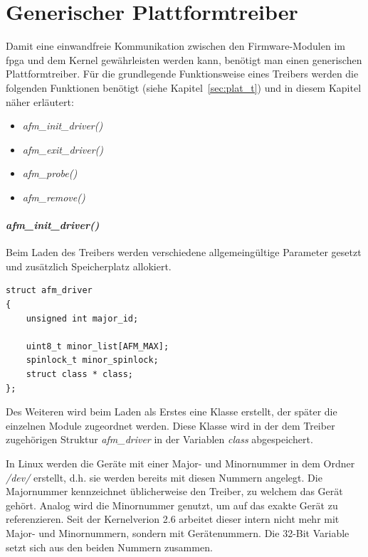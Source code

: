 \section{Generischer Plattformtreiber} \label{sec:plat}
Damit eine einwandfreie Kommunikation zwischen den Firmware-Modulen im \ac{fpga} und dem Kernel gewährleisten werden kann, benötigt man einen generischen Plattformtreiber.
Für die grundlegende  Funktionsweise eines Treibers werden die folgenden Funktionen benötigt (siehe Kapitel~\ref{sec:plat_t}) und in diesem Kapitel näher erläutert:

\begin{itemize}
	\item \textit{afm\_init\_driver()}
	\item \textit{afm\_exit\_driver()}
	\item \textit{afm\_probe()}
	\item \textit{afm\_remove()}
\end{itemize}


\paragraph*{\textit{afm\_init\_driver()}}
Beim Laden des Treibers werden verschiedene allgemeingültige Parameter gesetzt und zusätzlich Speicherplatz allokiert. 


\begin{lstfloat}
\begin{lstlisting}
struct afm_driver
{
	unsigned int major_id;

	uint8_t minor_list[AFM_MAX];
	spinlock_t minor_spinlock;
	struct class * class;
};
\end{lstlisting}
\end{lstfloat}

Des Weiteren wird beim Laden als Erstes eine Klasse erstellt, der später die einzelnen Module zugeordnet werden. Diese Klasse wird in der dem Treiber zugehörigen Struktur \textit{afm\_driver} in der Variablen \textit{class} abgespeichert. 

In Linux werden die Geräte mit einer Major- und Minornummer in dem Ordner \textit{/dev/} erstellt, d.h. sie werden bereits mit diesen Nummern angelegt.
Die Majornummer kennzeichnet üblicherweise den Treiber, zu welchem das Gerät gehört. Analog wird die Minornummer genutzt, um auf das exakte Gerät zu referenzieren. \citep[S. 43f.]{corbet2005linux} %
Seit der Kernelverion 2.6 arbeitet dieser intern nicht mehr mit Major- und Minornummern, sondern mit Gerätenummern. Die 32-Bit Variable setzt sich aus den beiden Nummern zusammen. \citep[Seite 244]{schroder2009embedded}%


